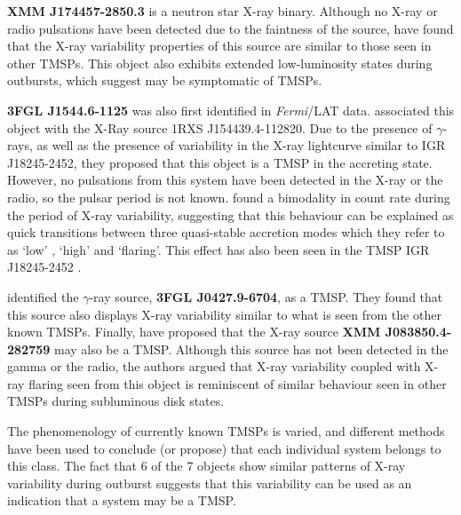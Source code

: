 \par \textbf{XMM J174457-2850.3} is a neutron star X-ray binary. Although no X-ray or radio pulsations have been detected due to the faintness of the source, \citealp{Degenaar_174457} have found that the X-ray variability properties of this source are similar to those seen in other TMSPs. This object also exhibits extended low-luminosity states during outbursts, which \citealp{Degenaar_174457} suggest may be symptomatic of TMSPs.
\par \textbf{3FGL J1544.6-1125} was also first identified in \textit{Fermi}/LAT data. \citealp{Bogdanov_Proxy} associated this object with the X-Ray source 1RXS J154439.4-112820. Due to the presence of $\gamma$-rays, as well as the presence of variability in the X-ray lightcurve similar to IGR J18245-2452, they proposed that this object is a TMSP in the accreting state. However, no pulsations from this system have been detected in the X-ray or the radio, so the pulsar period is not known. \citealp{Bogdanov_Proxy} found a bimodality in count rate during the period of X-ray variability, suggesting that this behaviour can be explained as quick transitions between three quasi-stable accretion modes which they refer to as `low' , `high' and `flaring'. This effect has also been seen in the TMSP IGR J18245-2452 \citep{Ferrigno_TMSPVar}.
\par \citealp{Strader_6} identified the $\gamma$-ray source, \textbf{3FGL J0427.9-6704}, as a TMSP. They found that this source also displays X-ray variability similar to what is seen from the other known TMSPs. Finally, \citealp{Rea_J0838} have proposed that the X-ray source \textbf{XMM J083850.4-282759} may also be a TMSP. Although this source has not been detected in the gamma or the radio, the authors argued that X-ray variability coupled with X-ray flaring seen from this object is reminiscent of similar behaviour seen in other TMSPs during subluminous disk states.
\par The phenomenology of currently known TMSPs is varied, and different methods have been used to conclude (or propose) that each individual system belongs to this class. The fact that 6 of the 7 objects show similar patterns of X-ray variability during outburst suggests that this variability can be used as an indication that a system may be a TMSP.

